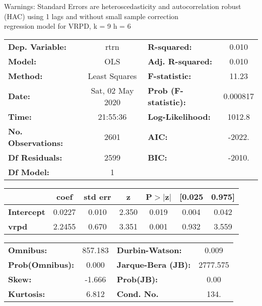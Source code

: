 Warnings: \newline
 [1] Standard Errors are heteroscedasticity and autocorrelation robust (HAC) using 1 lags and without small sample correction\\ 

regression model for VRPD, k = 9 h = 6\begin{center}
\begin{tabular}{lclc}
\toprule
\textbf{Dep. Variable:}    &       rtrn       & \textbf{  R-squared:         } &     0.010   \\
\textbf{Model:}            &       OLS        & \textbf{  Adj. R-squared:    } &     0.010   \\
\textbf{Method:}           &  Least Squares   & \textbf{  F-statistic:       } &     11.23   \\
\textbf{Date:}             & Sat, 02 May 2020 & \textbf{  Prob (F-statistic):} &  0.000817   \\
\textbf{Time:}             &     21:55:36     & \textbf{  Log-Likelihood:    } &    1012.8   \\
\textbf{No. Observations:} &        2601      & \textbf{  AIC:               } &    -2022.   \\
\textbf{Df Residuals:}     &        2599      & \textbf{  BIC:               } &    -2010.   \\
\textbf{Df Model:}         &           1      & \textbf{                     } &             \\
\bottomrule
\end{tabular}
\begin{tabular}{lcccccc}
                   & \textbf{coef} & \textbf{std err} & \textbf{z} & \textbf{P$> |$z$|$} & \textbf{[0.025} & \textbf{0.975]}  \\
\midrule
\textbf{Intercept} &       0.0227  &        0.010     &     2.350  &         0.019        &        0.004    &        0.042     \\
\textbf{vrpd}      &       2.2455  &        0.670     &     3.351  &         0.001        &        0.932    &        3.559     \\
\bottomrule
\end{tabular}
\begin{tabular}{lclc}
\textbf{Omnibus:}       & 857.183 & \textbf{  Durbin-Watson:     } &    0.009  \\
\textbf{Prob(Omnibus):} &   0.000 & \textbf{  Jarque-Bera (JB):  } & 2777.575  \\
\textbf{Skew:}          &  -1.666 & \textbf{  Prob(JB):          } &     0.00  \\
\textbf{Kurtosis:}      &   6.812 & \textbf{  Cond. No.          } &     134.  \\
\bottomrule
\end{tabular}
\end{center}


